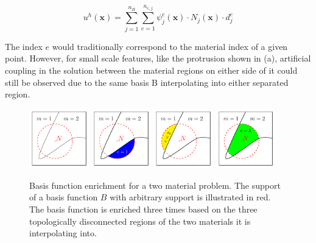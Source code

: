 \begin{equation}
\label{eqn:enrichment}
    u^h(\bm{x}) = \sum_{j = 1}^{n_B} \sum_{e = 1}^{n_{e,j}} \psi_{j}^{e}(\bm{x}) \cdot N_j(\bm{x}) \cdot d_{j}^{e}
\end{equation}{}

The index $e$ would traditionally correspond to the material index of a given point. However, for small scale features, like the protrusion shown in  (a), artificial coupling in the solution between the material regions on either side of it could still be observed due to the same basis B interpolating into either separated region.

\begin{figure}[H]
    \centering
	\centering
	\includegraphics[width=0.23\textwidth]{Figures/fig_enrichment.pdf}
	\includegraphics[width=0.23\textwidth]{Figures/fig_enrichment1.pdf}	\includegraphics[width=0.23\textwidth]{Figures/fig_enrichment2.pdf}
	\includegraphics[width=0.23\textwidth]{Figures/fig_enrichment3.pdf}
	\caption{ Basis function enrichment for a two material problem. The support of a basis function $B$ with arbitrary support is illustrated in red. The basis function is enriched three times based on the three topologically disconnected regions of the two materials it is interpolating into.}
	\label{fig:basis_function_enrichment}
\end{figure}

